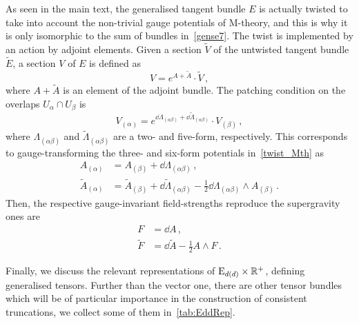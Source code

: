 \documentclass[debug]{phd}
\begin{document}
			 As seen in the main text, the generalised tangent bundle $E$ is actually twisted to take into account the non-trivial gauge potentials of M-theory, and this is why it is only isomorphic to the sum of bundles in~\eqref{gense7}.  The twist is implemented by an action by adjoint elements.
			 Given a section $\tilde{V}$ of the untwisted tangent bundle $\tilde{E}$, a section $V$ of $E$ is defined as
					\begin{equation}\label{twist_Mth}
						V = e^{A + \tilde A}  \cdot \tilde{V} \, , 
					\end{equation}
			where $A + \tilde A$ is an element of the adjoint bundle.
			The patching condition on the overlaps $U_{\alpha} \cap U_{\beta}$ is 
					\begin{equation}
						V_{(\alpha)} = e^{\dd \Lambda_{(\alpha \beta)} + \dd \tilde \Lambda_ {(\alpha \beta)}} \cdot V_{(\beta)} \, , 
					\end{equation}
			where $\Lambda_{(\alpha \beta)}$ and $ \tilde\Lambda_ {(\alpha \beta)}$ are a two- and five-form, respectively. 
			This corresponds to gauge-transforming the three- and six-form potentials in~\eqref{twist_Mth} as 
					\begin{equation}
						\begin{split}
							A_{(\alpha)} &= A_{(\beta)} + \dd \Lambda_{(\alpha \beta)} \, ,  \\
							\tilde A_{(\alpha)} &= \tilde A_{(\beta)} + \dd \tilde \Lambda_{(\alpha \beta)}  -\frac{1}{2}   \dd \Lambda_{(\alpha \beta)}  \wedge A_{(\beta)} \, .
						\end{split}
					\end{equation}
			Then, the respective gauge-invariant field-strengths reproduce the supergravity ones are
					\begin{equation}
						\begin{split}
								F &= \dd A \, ,  \\
							\tilde F &= \dd \tilde A - \frac{1}{2} A \wedge F \, .
						\end{split}
					\end{equation}
				
			Finally, we discuss the relevant representations of $\mathrm{E}_{d(d)}\times \mathbb{R}^+$, defining generalised tensors.
			Further than the vector one, there are other tensor bundles which will be of particular importance in the construction of consistent truncations, we collect some of them in~\cref{tab:EddRep}.
			
\end{document}
